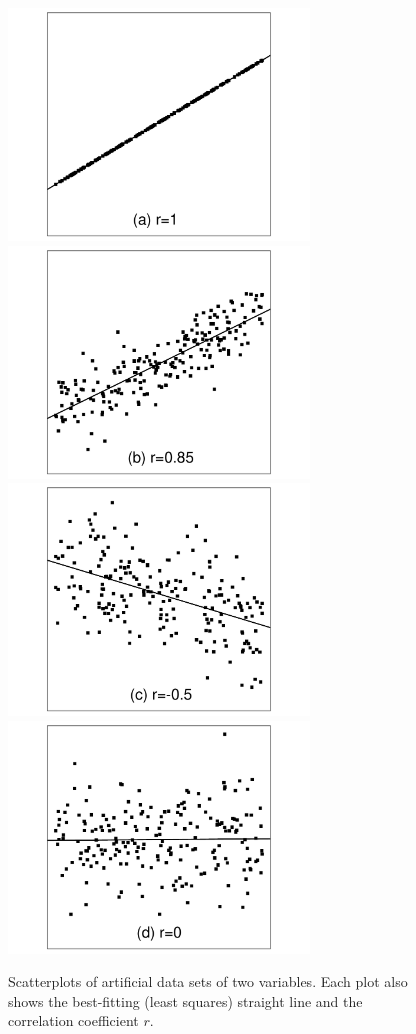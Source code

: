 \begin{figure}
\caption{
Scatterplots of artificial data sets of two variables. Each plot
also shows the best-fitting (least squares) straight line and the
correlation coefficient $r$.
}
\label{f_scatterplots}
\begin{center}

\includegraphics[width=8cm]{olspl1}
\includegraphics[width=8cm]{olspl2}\\

\includegraphics[width=8cm]{olspl3}
\includegraphics[width=8cm]{olspl4}\\


\end{center}
\end{figure}
